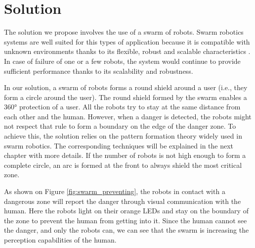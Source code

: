 \documentclass[oneside, a4paper, 12pt]{memoir}
\begin{document}
	
	\section{Solution}
	

	
	The solution we propose involves the use of a swarm of robots. Swarm robotics systems are well suited for this types of application because it is compatible with unknown environments thanks to its flexible, robust and scalable characteristics \citep{brambilla2013swarm}. In case of failure of one or a few robots, the system would continue to provide sufficient performance thanks to its scalability and robustness.
	
	In our solution, a swarm of robots forms a round shield around a user (i.e., they form a circle around the user). The round shield formed by the swarm enables a 360° protection of a user. All the robots try to stay at the same distance from each other and the human. However, when a danger is detected, the robots might not respect that rule to form a boundary on the edge of the danger zone. To achieve this, the solution relies on the pattern formation theory widely used in swarm robotics. The corresponding techniques will be explained in the next chapter with more details. If the number of robots is not high enough to form a complete circle, an arc is formed at the front to always shield the most critical zone.
	
	As shown on Figure \ref{fig:swarm_preventing}, the robots in contact with a dangerous zone will report the danger through visual communication with the human. Here the robots light on their orange LEDs and stay on the boundary of the zone to prevent the human from getting into it. Since the human cannot see the danger, and only the robots can, we can see that the swarm is increasing the perception capabilities of the human.
		
\end{document}
